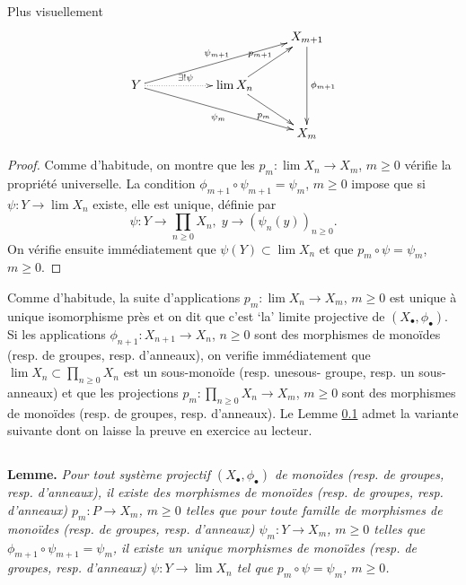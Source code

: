 \documentclass[a4paper, oneside, 12pt]{book}
\theoremstyle{theoremeStyle} %
\theoremstyle{definition} %
\begin{document}
  Plus visuellement
 $$\xymatrix{
 &&&X_{m+1}\ar[dd]^{\phi_{m+1}}\\
 Y\ar@{.>}[rr]^{\exists ! \psi}\ar[urrr]^{\psi_{m+1}}\ar[drrr]_{\psi_m}&&\lim X_n\ar[ur]^{p_{m+1}}\ar[dr]_{p_m}&\\
 &&&X_m
 }$$
 \begin{proof} Comme d'habitude, on montre que les $p_m:\lim X_n\rightarrow X_m$, $m\geq 0$ vérifie la propriété universelle. La condition  $\phi_{m+1}\circ \psi_{m+1}=\psi_m$, $m\geq 0$ impose que si $\psi:Y\rightarrow  \lim X_n$ existe, elle est unique, définie par
  $$\psi:Y\rightarrow\prod_{n\geq 0}X_n,\; y\rightarrow (\psi_n(y))_{n\geq 0}.$$
  On vérifie ensuite immédiatement que $\psi(Y)\subset  \lim X_n$ et que $p_m\circ \psi=\psi_m$, $m\geq 0.$
 \end{proof}
  Comme d'habitude, la suite d'applications  $p_m:\lim X_n\rightarrow X_m$, $m\geq 0$ est unique à unique isomorphisme près et on dit que  c'est `la' limite projective   de $(X_\bullet,\phi_\bullet)$.  \\


  Si les applications $\phi_{n+1}:X_{n+1}\rightarrow X_n$, $n\geq 0$ sont des morphismes de monoïdes (resp. de groupes, resp. d'anneaux), on verifie immédiatement que   $ \lim X_n\subset \prod_{n\geq 0} X_n$ est un sous-monoïde  (resp. unesous- groupe, resp. un sous-anneaux) et que les projections  $p_m:\prod_{n\geq 0}X_n\rightarrow X_m$, $m\geq 0$ sont des morphismes de monoïdes (resp. de groupes, resp. d'anneaux). Le Lemme \ref{LimProj} admet la variante suivante dont on laisse la preuve en exercice au lecteur.

  \subsection{}\label{LimProj}\textbf{Lemme.}   \textit{Pour tout système projectif $(X_\bullet,\phi_\bullet)$ de monoïdes (resp. de groupes, resp. d'anneaux),  il existe des morphismes de monoïdes (resp. de groupes, resp. d'anneaux) $p_m:P\rightarrow X_m$, $m\geq 0$ telles que pour toute famille  de morphismes de monoïdes (resp. de groupes, resp. d'anneaux) $\psi_m:Y\rightarrow X_m$, $m\geq 0$ telles que $\phi_{m+1}\circ \psi_{m+1}=\psi_m$, il existe un  unique morphismes de monoïdes (resp. de groupes, resp. d'anneaux) $\psi:Y\rightarrow \lim X_n$ tel  que $p_m\circ \psi=\psi_m$, $m\geq 0$.}\\
\end{document}
